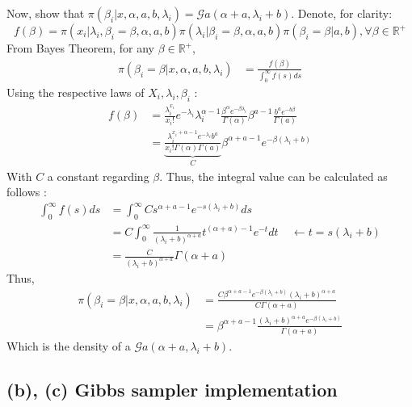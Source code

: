 \documentclass{article}
\newcommand{\R}{\mathbb R}
\begin{document}
\noindent Now, show that $\pi(\beta_i|x, \alpha, a, b, \lambda_i) =
 \mathcal{G}a(\alpha + a, \lambda_i + b)$. Denote, for clarity:  \[f(\beta) = 
 \pi(x_i | \lambda_i, \beta_i= \beta, \alpha, a, b )
        \pi(\lambda_i|\beta_i=\beta, \alpha, a, b)
        \pi(\beta_i = \beta| a, b), \forall \beta \in \R^+\]
         From Bayes Theorem, for any $\beta \in \R^+$,  
 \begin{align*}
    \pi(\beta_i = \beta | x, \alpha, a, b, \lambda_i) &=
        \frac{f(\beta)}
        {\int_0^\infty f(s)ds}  
 \end{align*}
 Using the respective laws of $X_i, \lambda_i, \beta_i$ : 
 \begin{align*}
     f(\beta) &= \frac{\lambda_i^{x_i}}{x_i!} 
                  e^{-\lambda_i}
                  \lambda_i^{\alpha-1} 
                  \frac{\beta^\alpha e^{-\beta\lambda_i} }{\Gamma(\alpha)}
                  \beta^{a-1} 
                  \frac{b^a e^{-b\beta}}{\Gamma(a)} \\
             &= \underset{C}{\underbrace{\frac{\lambda_i^{x_i+\alpha-1}e^{-\lambda_i}b^a   }
             {x_i! \Gamma(\alpha) \Gamma(a)} } }
             \beta^{\alpha+a-1}
              e^{-\beta(\lambda_i+b)}
 \end{align*}
 With $C$ a constant regarding $\beta$. Thus, the integral value can be calculated as follows :
 \begin{align*}
    \int_0^\infty f(s)ds &= \int_0^\infty C 
                            s^{\alpha+a-1}
                            e^{-s(\lambda_i+b)} ds  \\
                        &= C \int_0^\infty \frac{1}{(\lambda_i+b)^{\alpha+a} }
                            t^{(\alpha+a)-1}e^{-t} dt \ \ \ \ \ \leftarrow t = s(\lambda_i+b) \\
                        &= \frac{C}{(\lambda_i+b)^{\alpha+a} } \Gamma(\alpha +a)
 \end{align*}
 Thus, 
 \begin{align*}
     \pi(\beta_i = \beta | x, \alpha, a, b, \lambda_i) &= 
       \frac{
            C \beta^{\alpha+a-1}
            e^{-\beta(\lambda_i+b)}
            (\lambda_i+b)^{\alpha+a} 
       }
       {C \Gamma(\alpha+a)} \\
    &=  \beta^{\alpha+a-1}
    \frac{
        (\lambda_i+b)^{\alpha+a} 
        e^{-\beta(\lambda_i+b)}
   }
   { \Gamma(\alpha+a)}
 \end{align*}
Which is the density of a $\mathcal{G}a(\alpha+a, \lambda_i+b)$. 

\subsection*{(b), (c) Gibbs sampler implementation}
\end{document}
